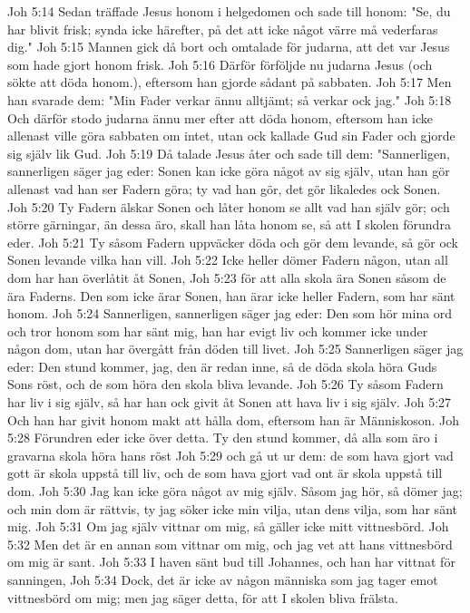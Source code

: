 Joh 5:14  Sedan träffade Jesus honom i helgedomen och sade till honom: "Se, du har blivit frisk; synda icke härefter, på det att icke något värre må vederfaras dig."
Joh 5:15  Mannen gick då bort och omtalade för judarna, att det var Jesus som hade gjort honom frisk.
Joh 5:16  Därför förföljde nu judarna Jesus (och sökte att döda honom.), eftersom han gjorde sådant på sabbaten.
Joh 5:17  Men han svarade dem: "Min Fader verkar ännu alltjämt; så verkar ock jag."
Joh 5:18  Och därför stodo judarna ännu mer efter att döda honom, eftersom han icke allenast ville göra sabbaten om intet, utan ock kallade Gud sin Fader och gjorde sig själv lik Gud.
Joh 5:19  Då talade Jesus åter och sade till dem: "Sannerligen, sannerligen säger jag eder: Sonen kan icke göra något av sig själv, utan han gör allenast vad han ser Fadern göra; ty vad han gör, det gör likaledes ock Sonen.
Joh 5:20  Ty Fadern älskar Sonen och låter honom se allt vad han själv gör; och större gärningar, än dessa äro, skall han låta honom se, så att I skolen förundra eder.
Joh 5:21  Ty såsom Fadern uppväcker döda och gör dem levande, så gör ock Sonen levande vilka han vill.
Joh 5:22  Icke heller dömer Fadern någon, utan all dom har han överlåtit åt Sonen,
Joh 5:23  för att alla skola ära Sonen såsom de ära Faderns. Den som icke ärar Sonen, han ärar icke heller Fadern, som har sänt honom.
Joh 5:24  Sannerligen, sannerligen säger jag eder: Den som hör mina ord och tror honom som har sänt mig, han har evigt liv och kommer icke under någon dom, utan har övergått från döden till livet.
Joh 5:25  Sannerligen säger jag eder: Den stund kommer, jag, den är redan inne, så de döda skola höra Guds Sons röst, och de som höra den skola bliva levande.
Joh 5:26  Ty såsom Fadern har liv i sig själv, så har han ock givit åt Sonen att hava liv i sig själv.
Joh 5:27  Och han har givit honom makt att hålla dom, eftersom han är Människoson.
Joh 5:28  Förundren eder icke över detta. Ty den stund kommer, då alla som äro i gravarna skola höra hans röst
Joh 5:29  och gå ut ur dem: de som hava gjort vad gott är skola uppstå till liv, och de som hava gjort vad ont är skola uppstå till dom.
Joh 5:30  Jag kan icke göra något av mig själv. Såsom jag hör, så dömer jag; och min dom är rättvis, ty jag söker icke min vilja, utan dens vilja, som har sänt mig.
Joh 5:31  Om jag själv vittnar om mig, så gäller icke mitt vittnesbörd.
Joh 5:32  Men det är en annan som vittnar om mig, och jag vet att hans vittnesbörd om mig är sant.
Joh 5:33  I haven sänt bud till Johannes, och han har vittnat för sanningen,
Joh 5:34  Dock, det är icke av någon människa som jag tager emot vittnesbörd om mig; men jag säger detta, för att I skolen bliva frälsta.
